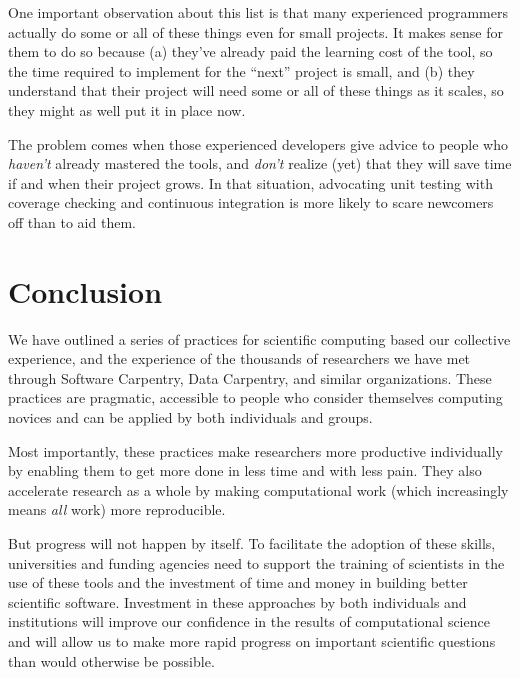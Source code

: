 \documentclass[10pt]{article}
\begin{document}
One important observation about this list is that many experienced
programmers actually do some or all of these things even for small
projects. It makes sense for them to do so because (a) they've already
paid the learning cost of the tool, so the time required to implement
for the ``next'' project is small, and (b) they understand that their
project will need some or all of these things as it scales, so they
might as well put it in place now.

The problem comes when those experienced developers give advice to
people who \emph{haven't} already mastered the tools, and
\emph{don't} realize (yet) that they will save time if and when their
project grows.  In that situation, advocating unit testing with
coverage checking and continuous integration is more likely to scare
newcomers off than to aid them.

\section{Conclusion}\label{sec:conclusion}

We have outlined a series of practices for scientific computing based
our collective experience, and the experience of the thousands of
researchers we have met through Software Carpentry, Data Carpentry,
and similar organizations.  These practices are pragmatic, accessible
to people who consider themselves computing novices and can be applied
by both individuals and groups.

Most importantly, these practices make researchers more productive
individually by enabling them to get more done in less time and with
less pain.  They also accelerate research as a whole by making
computational work (which increasingly means \emph{all} work) more
reproducible.

But progress will not happen by itself.  To facilitate the adoption of
these skills, universities and funding agencies need to support the
training of scientists in the use of these tools and the investment of
time and money in building better scientific software. Investment in
these approaches by both individuals and institutions will improve our
confidence in the results of computational science and will allow us
to make more rapid progress on important scientific questions than
would otherwise be possible.


\end{document}
